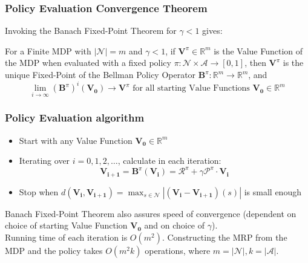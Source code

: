 \documentclass[handout]{beamer}
\newcommand{\bvpi}{\bm{V}^{\pi}}
\newcommand{\bbpi}{\bm{B}^{\pi}}
\begin{document}
\begin{frame}
\frametitle{Policy Evaluation Convergence Theorem}
Invoking the Banach Fixed-Point Theorem for $\gamma < 1$ gives:
\pause
\begin{theorem}
For a Finite MDP with $|\mathcal{N}| = m$ and $\gamma < 1$, if $\bvpi \in \mathbb{R}^m$ is the Value Function of the MDP when evaluated with a fixed policy $\pi: \mathcal{N} \times \mathcal{A} \rightarrow [0, 1]$, then $\bvpi$ is the unique Fixed-Point of the Bellman Policy Operator $\bbpi: \mathbb{R}^m \rightarrow \mathbb{R}^m$, and
$$\lim_{i\rightarrow \infty} ({\bbpi})^i(\bm{V_0}) \rightarrow \bvpi \text{ for all starting Value Functions } \bm{V_0} \in \mathbb{R}^m$$
\end{theorem}
\end{frame}

\begin{frame}
\frametitle{Policy Evaluation algorithm}
\pause
\begin{itemize}[<+->]
\item Start with any Value Function $\bm{V_0} \in \mathbb{R}^m$
\item Iterating over $i = 0, 1, 2, \ldots$, calculate in each iteration:
  $$\bm{V_{i+1}} = \bbpi(\bm{V_i}) = \bm{\mathcal{R}}^{\pi} + \gamma \bm{\mathcal{P}}^{\pi} \cdot \bm{V_i}$$
\item Stop when $d(\bm{V_i}, \bm{V_{i+1}}) = \max_{s \in \mathcal{N}} |(\bm{V_i} - \bm{V_{i+1}})(s)|$ is small enough
\end{itemize}
\vspace{5mm}
\pause
Banach Fixed-Point Theorem also assures speed of convergence (dependent on choice of starting Value Function $\bm{V_0}$ and on choice of $\gamma$).\\
\vspace{5mm}
\pause
Running time of each iteration is $O(m^2)$. Constructing the MRP from the MDP and the policy takes $O(m^2 k)$ operations, where $m = |\mathcal{N}|, k = |\mathcal{A}|$.

\end{frame}
\end{document}
